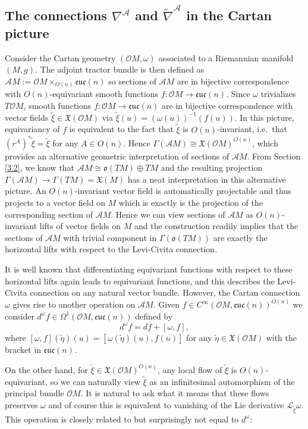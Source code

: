 \documentclass[12pt,a4paper]{amsart}
\def\frak{\mathfrak}
\def\Cal{\mathcal}
\newcommand{\x}{\times}
\newcommand{\om}{\omega}
\newcommand{\Ga}{\Gamma}
\newcommand{\Om}{\Omega}
\newcommand{\euc}{\mathfrak{euc}}
\newcommand{\tn}{\widetilde{\nabla}}
\numberwithin{theorem}{section}
\numberwithin{equation}{section}
\theoremstyle{definition}
\theoremstyle{remark}
\begin{document}
\subsection{The connections $\nabla^{\Cal A}$ and $\tn^{\Cal A}$ in the Cartan picture}\label{3.3}
Consider the Cartan geometry $(\Cal OM,\om)$ associated to a Riemannian manifold
$(M,g)$. The adjoint tractor bundle is then defined as $\Cal AM:=\Cal
OM\x_{O(n)}\euc(n)$ so sections of $\Cal AM$ are in bijective correspondence with
$O(n)$-equivariant smooth functions $f:\Cal OM\to\euc(n)$. Since $\om$ trivializes
$T\Cal OM$, smooth functions $f:\Cal OM\to\euc(n)$ are in bijective correspondence
with vector fields $\tilde\xi\in\frak X(\Cal OM)$ via
$\tilde\xi(u)=(\om(u))^{-1}(f(u))$. In this picture, equivariancy of $f$ is
equivalent to the fact that $\tilde\xi$ is $O(n)$-invariant, i.e.\ that
$(r^A)^*\tilde\xi=\tilde\xi$ for any $A\in O(n)$. Hence $\Ga(\Cal AM)\cong \frak
X(\Cal OM)^{O(n)}$, which provides an alternative geometric interpretation of
sections of $\Cal AM$. From Section \ref{3.2}, we know that $\Cal AM\cong \frak
o(TM)\oplus TM$ and the resulting projection $\Ga(\Cal AM)\to\Ga(TM)=\frak X(M)$ has
a neat interpretation in this alternative picture. An $O(n)$-invariant vector field
is automatically projectable and thus projects to a vector field on $M$ which is
exactly is the projection of the corresponding section of $\Cal AM$. Hence we can
view sections of $\Cal AM$ as $O(n)$-invariant lifts of vector fields on $M$ and the
construction readily implies that the sections of $\Cal AM$ with trivial component in
$\Ga(\frak o(TM))$ are exactly the horizontal lifts with respect to the Levi-Civita
connection.

It is well known that differentiating equivariant functions with respect to these
horizontal lifts again leads to equivariant functions, and this describes the
Levi-Civita connection on any natural vector bundle. However, the Cartan connection
$\om$ gives rise to another operation on $\Cal AM$. Given $f\in C^\infty(\Cal
OM,\euc(n))^{O(n)}$ we consider $d^\om f\in\Om^1(\Cal OM,\euc(n))$ defined by
  \begin{equation}\label{dom-def}
    d^\om f=df+[\om,f],
  \end{equation}
  where $[\om,f](\tilde\eta)(u)=[\om(\tilde\eta)(u),f(u)]$ for any
  $\tilde\eta\in\frak X(\Cal OM)$ with the bracket in $\euc(n)$.

On the other hand, for $\tilde\xi\in\frak X(\Cal OM)^{O(n)}$, any local flow of
$\tilde\xi$ is $O(n)$-equivariant, so we can naturally view $\tilde\xi$ as an
infinitesimal automorphism of the principal bundle $\Cal OM$. It is natural to ask
what it means that these flows preserves $\om$ and of course this is equivalent to
vanishing of the Lie derivative $\Cal L_{\tilde\xi}\om$. This operation is closely
related to but surprisingly not equal to $d^{\om}$:
\end{document}
